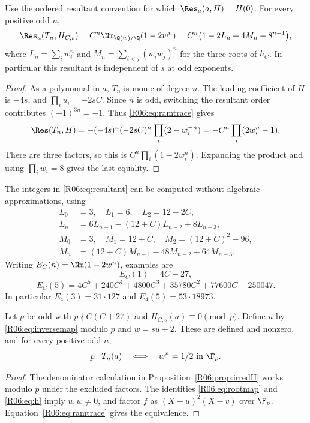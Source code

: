 \documentclass[11pt,a4paper]{article}
\theoremstyle{definition}\newtheorem{definition}[theorem]{Definition}
\theoremstyle{remark}\newtheorem{remark}[theorem]{Remark}
\begin{document}
\begin{proposition}\label{R06:prop:resultant}
Use the ordered resultant convention for which $\Res_a(a,H)=H(0)$.
For every positive odd $n$,
\begin{equation}\label{R06:eq:resultant}
 \Res_a(T_n,H_{C,s})
 =C^n\Nm_{\Q(w)/\Q}(1-2w^n)
 =C^n\bigl(1-2L_n+4M_n-8^{n+1}\bigr),
\end{equation}
where $L_n=\sum_iw_i^n$ and $M_n=\sum_{i<j}(w_iw_j)^n$ for the
three roots of $h_C$. In particular this resultant is independent
of $s$ at odd exponents.
\end{proposition}
\begin{proof}
As a polynomial in $a$, $T_n$ is monic of degree $n$.
The leading coefficient of $H$ is $-4s$, and
$\prod_i u_i=-2sC$. Since $n$ is odd, switching the resultant order
contributes $(-1)^{3n}=-1$. Thus \eqref{R06:eq:ramtrace} gives
\[
 \Res(T_n,H)=-(-4s)^n(-2sC)^n
       \prod_i(2-w_i^{-n})
 =-C^n\prod_i(2w_i^n-1).
\]
There are three factors, so this is $C^n\prod_i(1-2w_i^n)$.
Expanding the product and using $\prod_iw_i=8$ gives the last equality.
\end{proof}

The integers in \eqref{R06:eq:resultant} can be computed without algebraic
approximations, using
\[
 \begin{aligned}
 L_0&=3,\quad L_1=6,\quad L_2=12-2C,\\
 L_n&=6L_{n-1}-(12+C)L_{n-2}+8L_{n-3},\\
 M_0&=3,\quad M_1=12+C,\quad M_2=(12+C)^2-96,\\
 M_n&=(12+C)M_{n-1}-48M_{n-2}+64M_{n-3}.
 \end{aligned}
\]
Writing $E_C(n)=\Nm(1-2w^n)$, examples are
\[
 E_C(1)=4C-27,
\]
\[
 E_C(5)=4C^5+240C^4+4800C^3+35780C^2+77600C-250047.
\]
In particular $E_4(3)=31\cdot127$ and $E_4(5)=53\cdot18973$.

\begin{proposition}\label{R06:prop:local}
Let $p$ be odd with $p\nmid C(C+27)$ and $H_{C,s}(a)\equiv0\pmod p$.
Define $u$ by \eqref{R06:eq:inversemap} modulo $p$ and $w=su+2$.
These are defined and nonzero, and for every positive odd $n$,
\[
 p\mid T_n(a)\quad\Longleftrightarrow\quad w^n=1/2\text{ in }\F_p.
\]
\end{proposition}
\begin{proof}
The denominator calculation in Proposition~\ref{R06:prop:irredH}
works modulo $p$ under the excluded factors. The identities
\eqref{R06:eq:rootmap} and \eqref{R06:eq:h} imply $u,w\ne0$, and factor
$f$ as $(X-u)^2(X-v)$ over $\F_p$.
Equation~\eqref{R06:eq:ramtrace} gives the equivalence.
\end{proof}
\end{document}
